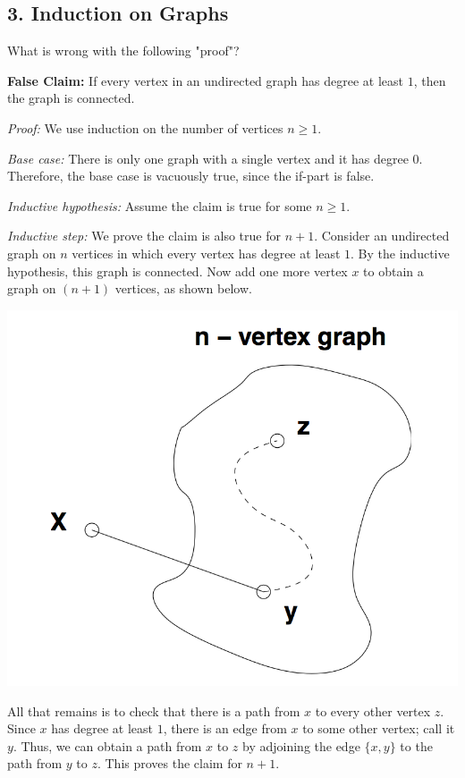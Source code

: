\documentclass{article}
\begin{document}
\subsection*{3. Induction on Graphs}
What is wrong with the following "proof"?

\vspace{3mm}
\noindent\textbf{False Claim:} If every vertex in an undirected graph has degree at least $1$, then the graph is connected.

\vspace{3mm}
\noindent\textit{Proof:} We use induction on the number of vertices $n\geqslant 1$.

\vspace{3mm}
\noindent\textit{Base case:} There is only one graph with a single vertex and it has degree $0$. Therefore, the base case is vacuously true, since the if-part is false.

\vspace{3mm}
\noindent\textit{Inductive hypothesis:} Assume the claim is true for some $n\geqslant 1$.

\vspace{3mm}
\noindent\textit{Inductive step:} We prove the claim is also true for $n+1$. Consider an undirected graph on $n$ vertices in which every vertex has degree at least $1$. By the inductive hypothesis, this graph is connected. Now add one more vertex $x$ to obtain a graph on $(n+1)$ vertices, as shown below.
\begin{center} \includegraphics[scale=0.15]{graph.png}\end{center}
All that remains is to check that there is a path from $x$ to every other vertex $z$. Since $x$ has degree at least $1$, there is an edge from $x$ to some other vertex; call it $y$. Thus, we can obtain a path from $x$ to $z$ by adjoining the edge $\{x, y\}$ to the path from $y$ to $z$. This proves the claim for $n+1$. 
\end{document}
